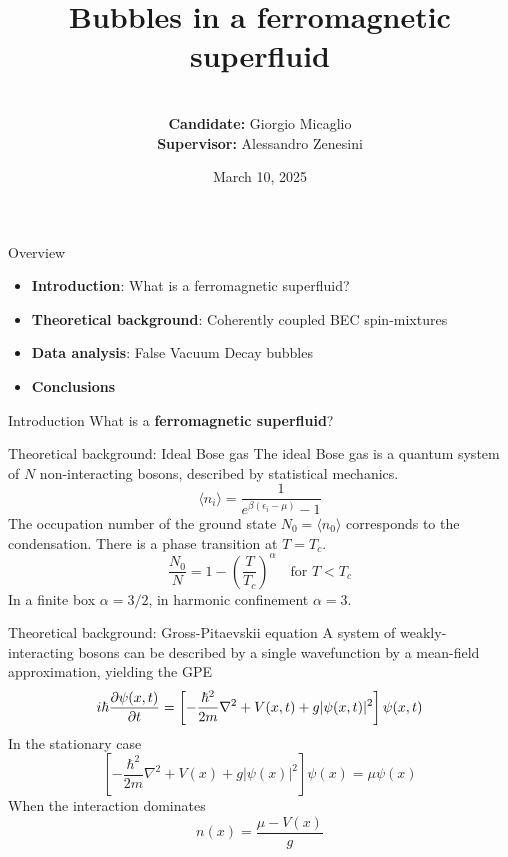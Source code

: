 \documentclass[handout]{beamer}
\title{Bubbles in a ferromagnetic superfluid}
\author{\\\textbf{Candidate:} Giorgio Micaglio\\ \textbf{Supervisor:} Alessandro Zenesini }
\date{March 10, 2025}
\institute{\\~\\Bachelor's Degree in Physics}
\begin{document}
\begin{frame}[plain]
    \maketitle
\end{frame}

\begin{frame}{Overview}
    \begin{itemize}
        \item \textbf{Introduction}: What is a ferromagnetic superfluid?
        \item \textbf{Theoretical background}: Coherently coupled BEC spin-mixtures
        \item \textbf{Data analysis}: False Vacuum Decay bubbles
        \item \textbf{Conclusions}
    \end{itemize}
\end{frame}

\begin{frame}{Introduction}
    What is a \textbf{ferromagnetic superfluid}?
\end{frame}

\begin{frame}{Theoretical background: Ideal Bose gas}
    The ideal Bose gas is a quantum system of $N$ non-interacting bosons, described by statistical mechanics.
    \begin{equation*}
        \langle n_i \rangle = \frac{1}{e^{\beta(\epsilon_i - \mu)}-1}
    \end{equation*}
    The occupation number of the ground state $N_0 = \langle n_0\rangle$ corresponds to the condensation. There is a phase transition at $T = T_c$.
    \begin{equation*}
        \frac{N_0}{N} = 1-\left(\frac{T}{T_c}\right)^\alpha \quad \text{for } T < T_c
    \end{equation*}
    In a finite box $\alpha = 3/2$, in harmonic confinement $\alpha = 3$.
\end{frame}

\begin{frame}{Theoretical background: Gross-Pitaevskii equation}
    A system of weakly-interacting bosons can be described by a single wavefunction by a mean-field approximation, yielding the GPE
    \begin{equation*}
        i\hbar \pdv{\psi(x,t)}{t} = \left[ 
            -\frac{\hbar^2}{2m}\nabla^2 + V(x,t) + g|\psi(x,t)|^2
        \right] \psi(x,t)
    \end{equation*}
    In the stationary case
    \begin{equation*}
        \left[ 
            -\frac{\hbar^2}{2m}\nabla^2 + V(x) + g|\psi(x)|^2
        \right] \psi(x) = \mu \psi(x)
    \end{equation*}
    When the interaction dominates
    \begin{equation*}
        n(x) = \frac{\mu - V(x)}{g}
    \end{equation*}
\end{frame}
\end{document}
